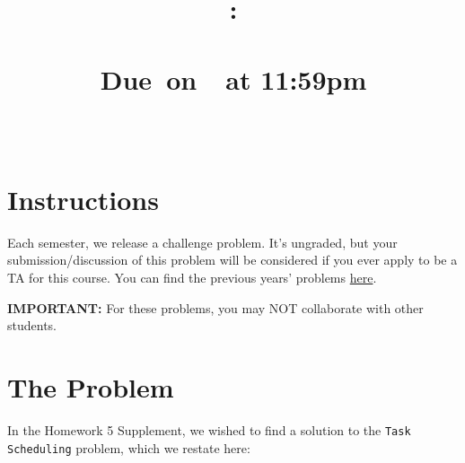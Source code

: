 \documentclass{article}
\title{
    \vspace{2in}
    \textbf{\hmwkClass:\\ \hmwkTitle} \\
    \normalsize\vspace{0.1in}\small{Due\ on\ \hmwkDueDate\ at 11:59pm} \\
    \vspace{0.1in}\large{\textit{\hmwkClassInstructor\ \hmwkSection}} \\
    \vspace{1in}
    
    \vspace{1in}
    \author{\textbf{\hmwkAuthorName}}
    \date{}
}
\begin{document}
\maketitle
\pagebreak


\section*{Instructions}
    Each semester, we release a challenge problem. It's ungraded, but your submission/discussion of this problem will be considered if you ever apply to be a TA for this course. You can find the previous years' problems \href{https://github.com/sar-mo/CS2051-HonorsDiscreteMath/blob/main/sp22/extra-credit/Exam 2 Extra Credit.pdf}{here}. 

    \vspace{4mm}
    \textbf{IMPORTANT:} For these problems, you may NOT collaborate with other students.

\section*{The Problem}
    In the Homework 5 Supplement, we wished to find a solution to the \texttt{Task Scheduling} problem, which we restate here:
\end{document}
